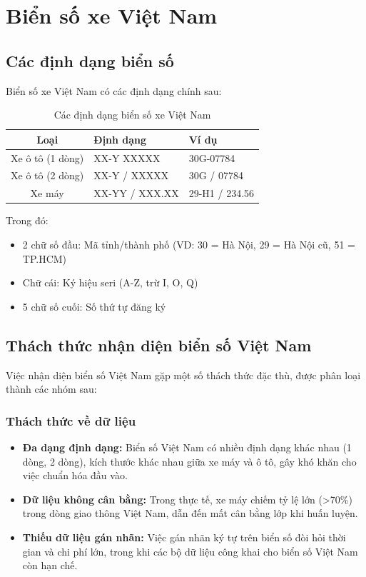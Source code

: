 \section{Biển số xe Việt Nam}

\subsection{Các định dạng biển số}
Biển số xe Việt Nam có các định dạng chính sau:

\begin{table}[!ht]
\centering
\caption{Các định dạng biển số xe Việt Nam}
\label{tab:vn_plate_format}
\begin{tabular}{|c|l|l|}
\hline
\textbf{Loại} & \textbf{Định dạng} & \textbf{Ví dụ} \\ \hline
Xe ô tô (1 dòng) & XX-Y XXXXX & 30G-07784 \\ \hline
Xe ô tô (2 dòng) & XX-Y / XXXXX & 30G / 07784 \\ \hline
Xe máy & XX-YY / XXX.XX & 29-H1 / 234.56 \\ \hline
\end{tabular}
\end{table}

Trong đó:
\begin{itemize}
    \item 2 chữ số đầu: Mã tỉnh/thành phố (VD: 30 = Hà Nội, 29 = Hà Nội cũ, 51 = TP.HCM)
    \item Chữ cái: Ký hiệu seri (A-Z, trừ I, O, Q)
    \item 5 chữ số cuối: Số thứ tự đăng ký
\end{itemize}

\subsection{Thách thức nhận diện biển số Việt Nam}
Việc nhận diện biển số Việt Nam gặp một số thách thức đặc thù, được phân loại thành các nhóm sau:

\subsubsection{Thách thức về dữ liệu}
\begin{itemize}
    \item \textbf{Đa dạng định dạng:} Biển số Việt Nam có nhiều định dạng khác nhau (1 dòng, 2 dòng), kích thước khác nhau giữa xe máy và ô tô, gây khó khăn cho việc chuẩn hóa đầu vào.
    \item \textbf{Dữ liệu không cân bằng:} Trong thực tế, xe máy chiếm tỷ lệ lớn (>70\%) trong dòng giao thông Việt Nam, dẫn đến mất cân bằng lớp khi huấn luyện.
    \item \textbf{Thiếu dữ liệu gán nhãn:} Việc gán nhãn ký tự trên biển số đòi hỏi thời gian và chi phí lớn, trong khi các bộ dữ liệu công khai cho biển số Việt Nam còn hạn chế.
\end{itemize}

